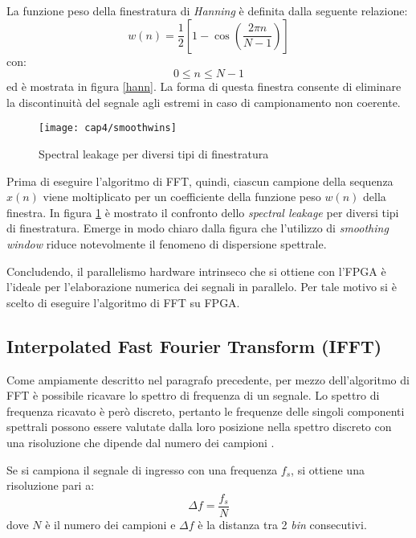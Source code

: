 La funzione peso della finestratura di \textit{Hanning} è definita dalla seguente relazione:
\begin{equation}
	w(n) = \frac{1}{2} \left [  1 - \cos \left ( \frac{2 \pi n}{N - 1} \right ) \right ]
\end{equation}
con:
$$ 0 \leq n \leq N-1 $$
ed è mostrata in figura \ref{hann}. La forma di questa finestra consente di eliminare la discontinuità del segnale agli estremi in caso di campionamento non coerente. 
\begin{figure}  
  \begin{center}
    \texttt{[image: cap4/smoothwins]}
    \caption{Spectral leakage per diversi tipi di finestratura}
    \label{smoothwins}
  \end{center}
\end{figure}

Prima di eseguire l'algoritmo di FFT, quindi, ciascun campione della sequenza $x(n)$ viene moltiplicato per un coefficiente della funzione peso $w(n)$ della finestra. 
In figura \ref{smoothwins} è mostrato il confronto dello \textit{spectral leakage} per diversi tipi di finestratura. Emerge in modo chiaro dalla figura che l'utilizzo di \textit{smoothing window} riduce notevolmente il fenomeno di dispersione spettrale.

Concludendo, il parallelismo hardware intrinseco che si ottiene con l'FPGA è l'ideale per l'elaborazione numerica dei segnali in parallelo. Per tale motivo si è scelto di eseguire l'algoritmo di FFT su FPGA.

\subsection{Interpolated Fast Fourier Transform (IFFT)}
Come ampiamente descritto nel paragrafo precedente, per mezzo dell'algoritmo di FFT è possibile ricavare lo spettro di frequenza di un segnale. Lo spettro di frequenza ricavato è però discreto, pertanto le frequenze delle singoli componenti spettrali possono essere valutate dalla loro posizione nella spettro discreto con una risoluzione che dipende dal numero dei campioni \cite{31004}.

Se si campiona il segnale di ingresso con una frequenza $f_s$, si ottiene una risoluzione pari a:
\begin{equation}
	\Delta f = \frac{f_s}{N}
	\label{deltaf}
\end{equation}
dove $N$ è il numero dei campioni e $\Delta f$ è la distanza tra 2 \textit{bin} consecutivi.

